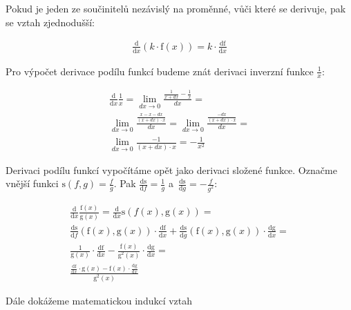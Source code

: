 Pokud je jeden ze součinitelů nezávislý na proměnné, vůči které se derivuje, pak se vztah zjednodušší:

\begin{equation}
\begin{split}
\frac{\mathrm{d}}{\mathrm{d}x} (k \cdot \mathrm{f}(x)) = k \cdot \frac{\mathrm{df}}{\mathrm{d}x}
\end{split}
\end{equation}

Pro výpočet derivace podílu funkcí budeme znát derivaci inverzní funkce \(\frac{1}{x}\):

\begin{equation}
\begin{split}
\frac{\mathrm{d}}{\mathrm{d}x} \frac{1}{x} = \lim_{dx \to 0} \frac{\frac{1}{x + dx} - \frac{1}{x}}{dx} = \\
\lim_{dx \to 0} \frac{\frac{x - x - dx}{(x + dx) \cdot x}}{dx} = \lim_{dx \to 0} \frac{\frac{-dx}{(x + dx) \cdot x}}{dx} = \\
\lim_{dx \to 0} \frac{-1}{(x + dx) \cdot x} = -\frac{1}{x^2}
\end{split}
\end{equation}

Derivaci podílu funkcí vypočítáme opět jako derivaci složené funkce. Označme vnější funkci \(\mathrm{s}(f, g) = \frac{f}{g}\). Pak \(\frac{\mathrm{ds}}{\mathrm{d}f} = \frac{1}{g}\) a~\(\frac{\mathrm{ds}}{\mathrm{d}g} = -\frac{f}{g^2}\):

\begin{equation}
\begin{split}
\frac{\mathrm{d}}{\mathrm{d}x} \frac{\mathrm{f}(x)}{\mathrm{g}(x)} = \frac{\mathrm{d}}{\mathrm{d}x} \mathrm{s}({f}(x), \mathrm{g}(x)) = \\
\frac{\mathrm{ds}}{\mathrm{d}f} (\mathrm{f}(x), \mathrm{g}(x)) \cdot \frac{\mathrm{df}}{\mathrm{d}x} + \frac{\mathrm{ds}}{\mathrm{d}g}(\mathrm{f}(x), \mathrm{g}(x)) \cdot \frac{\mathrm{dg}}{\mathrm{d}x} = \\
\frac{1}{\mathrm{g}(x)} \cdot \frac{\mathrm{df}}{\mathrm{d}x} -\frac{\mathrm{f}(x)}{\mathrm{g}^2(x)} \cdot \frac{\mathrm{dg}}{\mathrm{d}x} = \\
\frac{\frac{\mathrm{df}}{\mathrm{d}x} \cdot \mathrm{g}(x) - \mathrm{f}(x) \cdot \frac{\mathrm{dg}}{\mathrm{d}x}}{\mathrm{g}^2(x)}
\end{split}
\end{equation}

Dále dokážeme matematickou indukcí vztah

